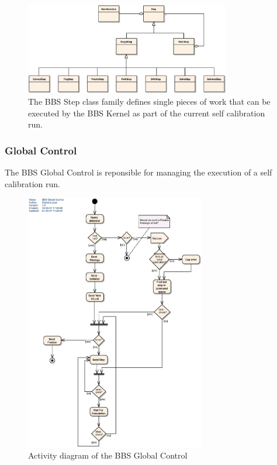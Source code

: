 \documentclass[10pt]{lofar}
\begin{document}
\begin{figure}[!ht]
\centering
\includegraphics[width=0.8\textwidth]{images/bbs-step-class-diagram}
\caption{The BBS Step class family defines single pieces of work that can be
executed by the BBS Kernel as part of the current self calibration run.}
\label{fig:bbsstep}
\end{figure}

\subsubsection{Global Control}
\label{subsubsec:design-global-control}
The BBS Global Control is reponsible for managing the execution of a self
calibration run.
\begin{figure}[!ht]
\centering
\includegraphics[width=0.7\textwidth]{images/bbs-global-control-activity-diagram}
\caption{Activity diagram of the BBS Global Control}
\label{fig:global-control-activity}
\end{figure}
\end{document}
